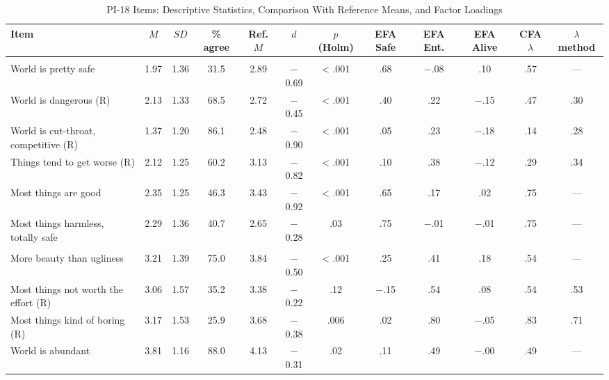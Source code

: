 \documentclass[journal,a4paper]{IEEEtran}
\begin{document}
\begin{table}[!htbp]
\centering
\renewcommand{\arraystretch}{1.15}
\footnotesize
\setlength{\tabcolsep}{2.6pt}
\caption{PI-18 Items: Descriptive Statistics, Comparison With Reference Means, and Factor Loadings}
\label{tab:s2}
\begin{tabular}{>{\raggedright\arraybackslash}p{5.0cm}ccccccccccc}
\toprule
Item & $M$ & $SD$ & \% agree & Ref. $M$ & $d$ & $p$ (Holm) & EFA Safe & EFA Ent. & EFA Alive & CFA $\lambda$ & $\lambda$ method \\
\midrule
\multicolumn{12}{l}{\emph{Safe}} \\
\hspace{0.8em}World is pretty safe & 1.97 & 1.36 & 31.5 & 2.89 & $-$0.69 & < .001 & .68 & $-$.08 & .10 & .57 & — \\
\hspace{0.8em}World is dangerous (R) & 2.13 & 1.33 & 68.5 & 2.72 & $-$0.45 & < .001 & .40 & .22 & $-$.15 & .47 & .30 \\
\hspace{0.8em}World is cut-throat, competitive (R) & 1.37 & 1.20 & 86.1 & 2.48 & $-$0.90 & < .001 & .05 & .23 & $-$.18 & .14 & .28 \\
\hspace{0.8em}Things tend to get worse (R) & 2.12 & 1.25 & 60.2 & 3.13 & $-$0.82 & < .001 & .10 & .38 & $-$.12 & .29 & .34 \\
\hspace{0.8em}Most things are good & 2.35 & 1.25 & 46.3 & 3.43 & $-$0.92 & < .001 & .65 & .17 & .02 & .75 & — \\
\hspace{0.8em}Most things harmless, totally safe & 2.29 & 1.36 & 40.7 & 2.65 & $-$0.28 & .03 & .75 & $-$.01 & $-$.01 & .75 & — \\
\multicolumn{12}{l}{\emph{Enticing}} \\
\hspace{0.8em}More beauty than ugliness & 3.21 & 1.39 & 75.0 & 3.84 & $-$0.50 & < .001 & .25 & .41 & .18 & .54 & — \\
\hspace{0.8em}Most things not worth the effort (R) & 3.06 & 1.57 & 35.2 & 3.38 & $-$0.22 & .12 & $-$.15 & .54 & .08 & .54 & .53 \\
\hspace{0.8em}Most things kind of boring (R) & 3.17 & 1.53 & 25.9 & 3.68 & $-$0.38 & .006 & .02 & .80 & $-$.05 & .83 & .71 \\
\hspace{0.8em}World is abundant & 3.81 & 1.16 & 88.0 & 4.13 & $-$0.31 & .02 & .11 & .49 & $-$.00 & .49 & — \\

\end{tabular}
\end{table}
\end{document}

